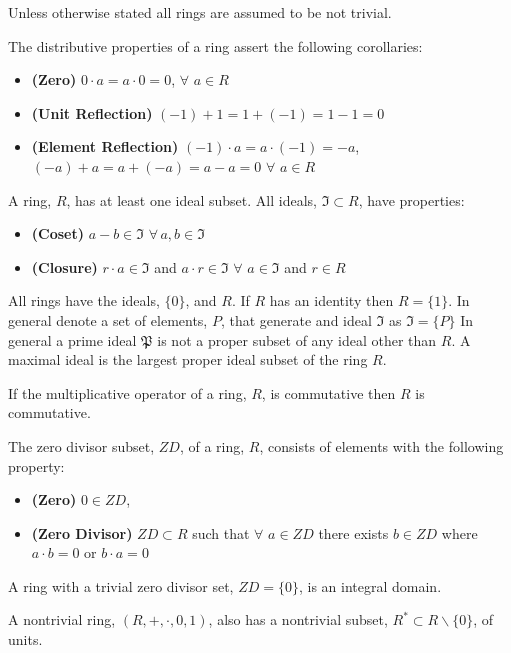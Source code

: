 \documentclass[aps,twocolumn,secnumarabic,nobalancelastpage,amsmath,amssymb,
amsthm,nofootinbib,parskip=full]{revtex4}
\begin{document}
Unless otherwise stated all rings are assumed to be not trivial.

The distributive properties of a ring assert the following corollaries:

\begin{itemize}
\item \textbf{\small (Zero)} $0\cdot a=a\cdot 0=0$, $\forall$ $a\in R$
\item \textbf{\small (Unit Reflection)} $(-1)+1=1+(-1)=1-1=0$
\item \textbf{\small (Element Reflection)} $(-1)\cdot a=a\cdot (-1)=-a$, 
$(-a)+a=a+(-a)=a-a=0$ $\forall$ $a\in R$
\end{itemize}

A ring, $R$, has at least one ideal subset. All ideals, 
$\mathfrak{I}\subset R$, have properties:

\begin{itemize}
\item \textbf{(Coset)} $a-b\in \mathfrak{I}\,\,\forall\, a,b\in\mathfrak{I}$
\item \textbf{(Closure)} $r\cdot a\in \mathfrak{I}$ and
  $a\cdot r\in\mathfrak{I}$ $\forall$ $a\in\mathfrak{I}$ and $r\in R$
\end{itemize}

All rings have the ideals, $\{0\}$, and $R$. If $R$ has an identity 
then $R=\{1\}$. In general denote a set of elements, $P$,
that generate and ideal $\mathfrak{I}$ as $\mathfrak{I}=\{P\}$ 
In general a prime ideal $\mathfrak{P}$ is not a proper subset 
of any ideal other than $R$. A maximal ideal is the largest 
proper ideal subset of the ring $R$.

If the multiplicative operator of a ring, $R$, is commutative then $R$ is commutative.

The zero divisor subset, $ZD$, of a ring, $R$,
consists of elements with the following property:

\begin{itemize}
\item \textbf{\small (Zero)} $0\in ZD$,
\item \textbf{\small (Zero Divisor)} $ZD\subset R$
  such that $\forall$ $a\in ZD$ there exists $b\in ZD$ where
  $a\cdot b=0$ or $b\cdot a=0$
\end{itemize}

A ring with a trivial zero divisor set, $ZD=\{0\}$, is an integral domain.

A nontrivial ring, $(R,+,\cdot,0,1)$, also has a nontrivial subset,
$R^*\subset R\backslash\{0\}$, of units.
\end{document}
